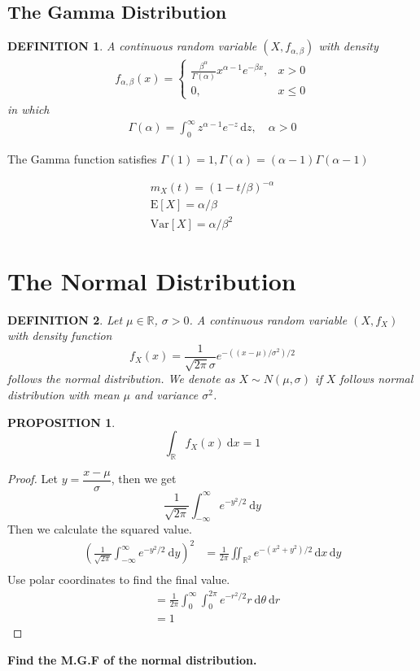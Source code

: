 \documentclass[11pt,a4paper]{article}
\newcommand{\dd}{\mathrm{d}}
\newcommand{\dx}{\dd x}
\newcommand{\dy}{\dd y}
\newcommand{\dz}{\dd z}
\newtheorem*{proposition}{\bf PROPOSITION}
\newtheorem*{definition}{\bf DEFINITION}
\begin{document}
\subsection{The Gamma Distribution}
\begin{definition}
    A continuous random variable
    $(X, f_{\alpha,\beta})$ with density
    \begin{gather*}
        f_{\alpha,\beta}(x)=\begin{cases}
            \frac{\beta^\alpha}{\Gamma(\alpha)}x^{\alpha-1}e^{-\beta x}, & x>0    \\
            0,                                                           & x\le 0
        \end{cases}
    \end{gather*}
    in which
    \begin{gather*}
        \Gamma(\alpha)=\int_{0}^{\infty}z^{\alpha-1}e^{-z}\,\dz, \quad \alpha>0
    \end{gather*}

\end{definition}
The Gamma function satisfies $\Gamma(1)=1,\Gamma(\alpha)=(\alpha-1)\Gamma(\alpha-1)$

\begin{gather*}
    m_X(t)=(1-t/\beta)^{-\alpha}\\
    \mathrm{E}[X]=\alpha/\beta\\
    \mathrm{Var}[X]=\alpha/\beta^2
\end{gather*}

\section{The Normal Distribution}
\begin{definition}
    Let $\mu\in\mathbb{R}$, $\sigma>0$. A continuous random variable $(X,f_X)$ with density function
    \[f_X(x) = \frac{1}{\sqrt{2\pi}\sigma}e^{-((x-\mu)/\sigma^2)/2}\]
    follows the normal distribution.
    We denote as $X\sim N(\mu,\sigma)$ if $X$ follows normal distribution with mean
    $\mu$ and variance $\sigma^2$.
\end{definition}

\begin{proposition}
    $$\int_{\mathbb{R}}f_X(x)\ \dx=1$$
\end{proposition}
\begin{proof}
    Let $y=\dfrac{x-\mu}{\sigma}$, then we get
    \[\frac{1}{\sqrt{2\pi}}\int_{-\infty}^{\infty}e^{-y^2/2}\ \dy\]
    Then we calculate the squared value.
    \begin{align*}
        \left(\frac{1}{\sqrt{2\pi}}\int_{-\infty}^{\infty}e^{-y^2/2}\ \dy\right)^2 & =
        \frac{1}{2\pi}\iint_{\mathbb{R}^2}e^{-(x^2+y^2)/2}\,\dx\,\dy                   \\
    \end{align*}
    Use polar coordinates to find the final value.
    \begin{align*}
         & =\frac{1}{2\pi}\int_{0}^{\infty}\int_{0}^{2\pi}e^{-r^2/2}r\ \dd\theta\ \dd r \\
         & = 1
    \end{align*}
\end{proof}
{\bf Find the M.G.F of the normal distribution.}
\end{document}
